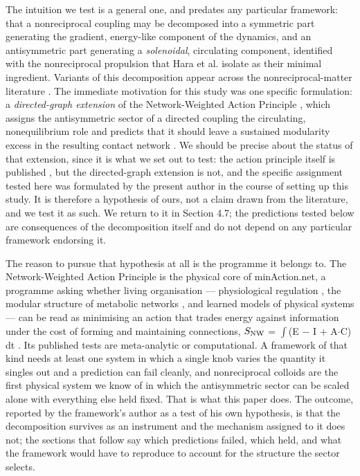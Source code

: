 \documentclass[aps,pre,preprint,superscriptaddress,nofootinbib,longbibliography]{revtex4-2}
\begin{document}
The intuition we test is a general one, and predates any particular framework: that a nonreciprocal coupling may be decomposed into a symmetric part generating the gradient, energy-like component of the dynamics, and an antisymmetric part generating a \emph{solenoidal}, circulating component, identified with the nonreciprocal propulsion that Hara et al. isolate as their minimal ingredient. Variants of this decomposition appear across the nonreciprocal-matter literature \cite{r15,r16,r17,r18}. The immediate motivation for this study was one specific formulation: a \emph{directed-graph extension} of the Network-Weighted Action Principle \cite{r9}, which assigns the antisymmetric sector of a directed coupling the circulating, nonequilibrium role and predicts that it should leave a sustained modularity excess in the resulting contact network \cite{r30}. We should be precise about the status of that extension, since it is what we set out to test: the action principle itself is published \cite{r9,r30,r33}, but the directed-graph extension is not, and the specific assignment tested here was formulated by the present author in the course of setting up this study. It is therefore a hypothesis of ours, not a claim drawn from the literature, and we test it as such. We return to it in Section 4.7; the predictions tested below are consequences of the decomposition itself and do not depend on any particular framework endorsing it.

The reason to pursue that hypothesis at all is the programme it belongs to. The Network-Weighted Action Principle is the physical core of minAction.net, a programme asking whether living organisation --- physiological regulation \cite{r9}, the modular structure of metabolic networks \cite{r30}, and learned models of physical systems \cite{r31,r32} --- can be read as minimising an action that trades energy against information under the cost of forming and maintaining connections, $S_{\rm NW}$ = $\int$(E $-$ I + A$\cdot$C) dt \cite{r9,r33}. Its published tests are meta-analytic or computational. A framework of that kind needs at least one system in which a single knob varies the quantity it singles out and a prediction can fail cleanly, and nonreciprocal colloids are the first physical system we know of in which the antisymmetric sector can be scaled alone with everything else held fixed. That is what this paper does. The outcome, reported by the framework's author as a test of his own hypothesis, is that the decomposition survives as an instrument and the mechanism assigned to it does not; the sections that follow say which predictions failed, which held, and what the framework would have to reproduce to account for the structure the sector selects.
\end{document}
